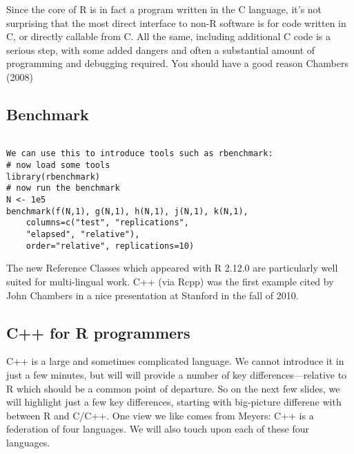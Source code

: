 \documentclass[]{article}
\begin{document}

Since the core of R is in fact a program
written in the C language, it’s not surprising
that the most direct interface to non-R
software is for code written in C, or directly
callable from C. All the same, including
additional C code is a serious step, with
some added dangers and often a
substantial amount of programming and
debugging required. You should have a
good reason
Chambers (2008)


\subsection{Benchmark}
\begin{framed}
\begin{verbatim}

We can use this to introduce tools such as rbenchmark:
# now load some tools
library(rbenchmark)
# now run the benchmark
N <- 1e5
benchmark(f(N,1), g(N,1), h(N,1), j(N,1), k(N,1),
	columns=c("test", "replications",
	"elapsed", "relative"),
	order="relative", replications=10)

\end{verbatim}
\end{framed}



The new Reference Classes which appeared with R 2.12.0 are
particularly well suited for multi-lingual work. C++ (via Rcpp)
was the ﬁrst example cited by John Chambers in a nice
presentation at Stanford in the fall of 2010.



\subsection{C++ for R programmers}

C++ is a large and sometimes complicated language.
We cannot introduce it in just a few minutes, but will will provide
a number of key differences—relative to R which should be a
common point of departure.
So on the next few slides, we will highlight just a few key
differences, starting with big-picture differene with between R
and C/C++.
One view we like comes from Meyers: C++ is a federation of
four languages. We will also touch upon each of these four
languages.
\end{document}
